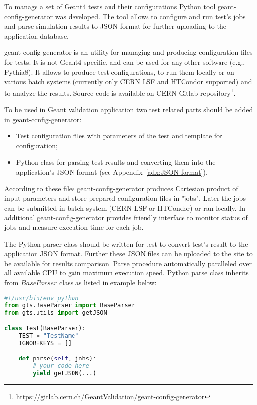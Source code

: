 To manage a set of Geant4 tests and their configurations Python tool geant-config-generator was developed. The tool allows to configure and run test's jobs and parse simulation results to JSON format for further uploading to the application database.

geant-config-generator is an utility for managing and producing configuration files for tests. It is not Geant4-specific, and can be used for any other software (e.g., Pythia8). It allows to produce test configurations, to run them locally or on various batch systems (currently only CERN LSF and HTCondor supported) and to analyze the results. Source code is available on
CERN Gitlab repository\footnote{https://gitlab.cern.ch/GeantValidation/geant-config-generator}.

To be used in Geant validation application two test related parts should be added in geant-config-generator:

\begin{itemize}
	\item Test configuration files with parameters of the test and template for configuration;
	\item Python class for parsing test results and converting them into the application's JSON format (see Appendix~\ref{adx:JSON-format}).
\end{itemize}

According to these files geant-config-generator produces Cartesian product of input parameters and store prepared configuration files in "jobs". Later the jobs can be submitted in batch system (CERN LSF or HTCondor) or ran locally. In additional geant-config-generator provides friendly interface to monitor status of jobs and measure execution time for each job.

The Python parser class should be written for test to convert test's result to the application JSON format. Further these JSON files can be uploaded to the site to be available for results comparison.
Parse procedure automatically paralleled over all available CPU to gain maximum execution speed.
Python parse class inherits from $BaseParser$ class as listed in example below:

\begin{lstlisting}[language=python,firstnumber=1]
#!/usr/bin/env python
from gts.BaseParser import BaseParser
from gts.utils import getJSON

class Test(BaseParser):
    TEST = "TestName"
    IGNOREKEYS = []

    def parse(self, jobs):
        # your code here
        yield getJSON(...)
\end{lstlisting}

